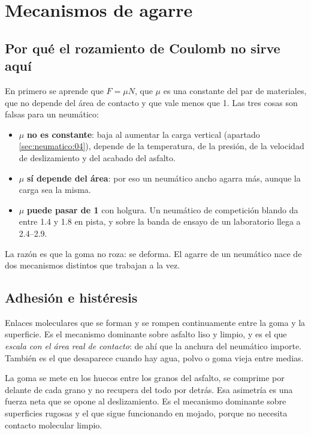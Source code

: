 
\section{Mecanismos de agarre}
\label{sec:neumatico:01}

\subsection{Por qué el rozamiento de Coulomb no sirve aquí}

En primero se aprende que $F = \mu N$, que $\mu$ es una constante del par de
materiales, que no depende del área de contacto y que vale menos que 1. Las tres
cosas son falsas para un neumático:

\begin{itemize}
  \item $\mu$ \textbf{no es constante}: baja al aumentar la carga vertical
        (apartado \ref{sec:neumatico:04}), depende de la temperatura, de la
        presión, de la velocidad de deslizamiento y del acabado del asfalto.
  \item $\mu$ \textbf{sí depende del área}: por eso un neumático ancho agarra
        más, aunque la carga sea la misma.
  \item $\mu$ \textbf{puede pasar de 1} con holgura. Un neumático de competición
        blando da entre \num{1.4} y \num{1.8} en pista, y sobre la banda de
        ensayo de un laboratorio llega a \numrange{2.4}{2.9}.
\end{itemize}

La razón es que la goma no roza: se deforma. El agarre de un neumático nace de
dos mecanismos distintos que trabajan a la vez.

\subsection{Adhesión e histéresis}

\begin{description}[leftmargin=0pt,labelsep=0pt,style=nextline]
  \item[Adhesión] Enlaces moleculares que se forman y se rompen continuamente
    entre la goma y la superficie. Es el mecanismo dominante sobre asfalto
    liso y limpio, y es el que \emph{escala con el área real de contacto}: de
    ahí que la anchura del neumático importe. También es el que desaparece
    cuando hay agua, polvo o goma vieja entre medias.
  \item[Histéresis] La goma se mete en los huecos entre los granos del asfalto,
    se comprime por delante de cada grano y no recupera del todo por detrás.
    Esa asimetría es una fuerza neta que se opone al deslizamiento. Es el
    mecanismo dominante sobre superficies rugosas y el que sigue funcionando
    en mojado, porque no necesita contacto molecular limpio.
\end{description}

